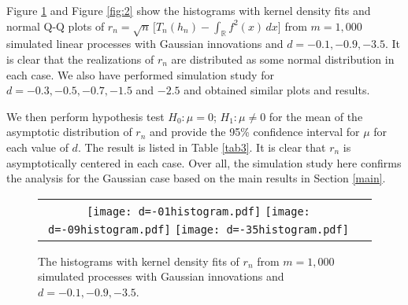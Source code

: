 \documentclass[11pt]{article}
\def\R{{\mathbb R}}
\begin{document}
Figure \ref{fig:1} and Figure \ref{fig:2} show the histograms with kernel density fits and normal Q-Q plots of $r_n=\sqrt{n}\, \Big[T_n(h_n)-\int_{\R} f^2(x)\,dx\Big]$ from $m=1,000$ simulated linear processes with Gaussian innovations and $d=-0.1,-0.9, -3.5$.  It is clear that the realizations of $r_n$ are distributed as some normal distribution in each case. We also have performed simulation study for $d=-0.3, -0.5,-0.7, -1.5$ and $-2.5$ and obtained similar plots and results.

We then perform hypothesis test $H_0:\mu=0$;  $H_1:\mu\ne 0$ for the mean of the asymptotic distribution of $r_n$ and provide the 95\% confidence interval for $\mu$ for each value of $d$. The result is listed in Table \ref{tab3}. It is clear that $r_n$ is  asymptotically centered  in each case. Over all, the simulation study here confirms the analysis for the Gaussian case based on the main results in Section \ref{main}. 
\begin{figure}[H]
\centering
\begin{tabular}{cc}
\texttt{[image: d=-01histogram.pdf]}
\texttt{[image: d=-09histogram.pdf]}
\texttt{[image: d=-35histogram.pdf]}
\end{tabular}
\caption {The histograms with kernel density fits of $r_n$ from $m=1,000$ simulated processes with Gaussian innovations and $d=-0.1, -0.9, -3.5$. \label{fig:1}}
\end{figure}
%
%
\end{document}
